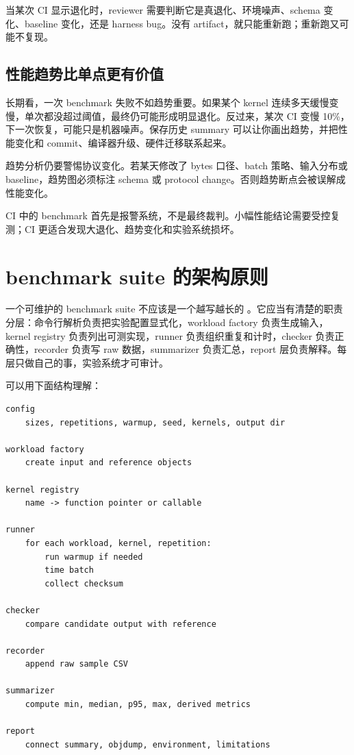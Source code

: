 当某次 CI 显示退化时，reviewer 需要判断它是真退化、环境噪声、schema 变化、baseline 变化，还是 harness bug。没有 artifact，就只能重新跑；重新跑又可能不复现。

\subsection{性能趋势比单点更有价值}

长期看，一次 benchmark 失败不如趋势重要。如果某个 kernel 连续多天缓慢变慢，单次都没超过阈值，最终仍可能形成明显退化。反过来，某次 CI 变慢 10\%，下一次恢复，可能只是机器噪声。保存历史 summary 可以让你画出趋势，并把性能变化和 commit、编译器升级、硬件迁移联系起来。

趋势分析仍要警惕协议变化。若某天修改了 bytes 口径、batch 策略、输入分布或 baseline，趋势图必须标注 schema 或 protocol change。否则趋势断点会被误解成性能变化。

\begin{keyidea}
CI 中的 benchmark 首先是报警系统，不是最终裁判。小幅性能结论需要受控复测；CI 更适合发现大退化、趋势变化和实验系统损坏。
\end{keyidea}

\section{benchmark suite 的架构原则}

一个可维护的 benchmark suite 不应该是一个越写越长的 。它应当有清楚的职责分层：命令行解析负责把实验配置显式化，workload factory 负责生成输入，kernel registry 负责列出可测实现，runner 负责组织重复和计时，checker 负责正确性，recorder 负责写 raw 数据，summarizer 负责汇总，report 层负责解释。每层只做自己的事，实验系统才可审计。

可以用下面结构理解：

\begin{lstlisting}
config
    sizes, repetitions, warmup, seed, kernels, output dir

workload factory
    create input and reference objects

kernel registry
    name -> function pointer or callable

runner
    for each workload, kernel, repetition:
        run warmup if needed
        time batch
        collect checksum

checker
    compare candidate output with reference

recorder
    append raw sample CSV

summarizer
    compute min, median, p95, max, derived metrics

report
    connect summary, objdump, environment, limitations
\end{lstlisting}

